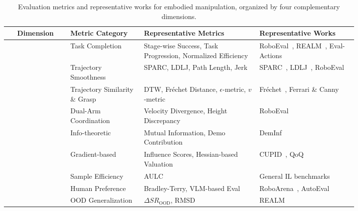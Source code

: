 \documentclass[acmsmall,screen,review,anonymous]{acmart}
\begin{document}
\begin{table}[t]
\centering
\caption{Evaluation metrics and representative works for embodied manipulation, organized by four complementary dimensions.}\label{tab:eval_metrics}
\renewcommand{\arraystretch}{1.15}
\setlength{\tabcolsep}{3pt}
\scriptsize
\begin{tabular}{
  c
  p{0.21\linewidth}
  p{0.33\linewidth}
  p{0.29\linewidth}
}
\toprule
\textbf{Dimension} & \textbf{Metric Category} & \textbf{Representative Metrics} & \textbf{Representative Works} \\
\midrule
{} 
 & Task Completion & Stage-wise Success, Task Progression, Normalized Efficiency & RoboEval~\cite{wang2025roboeval}, REALM~\cite{sedlacek2025realm}, Eval-Actions~\cite{liu2026evalactions} \\
 & Trajectory Smoothness & SPARC, LDLJ, Path Length, Jerk & SPARC~\cite{balasubramanian2015sparc}, LDLJ~\cite{antonelli2023movement}, RoboEval~\cite{wang2025roboeval} \\
 & Trajectory Similarity \& Grasp & DTW, Fr\'{e}chet Distance, $\epsilon$-metric, $v$-metric & Fr\'{e}chet~\cite{agarwal2012computingdiscretefrechetdistance}, Ferrari \& Canny~\cite{ferrari1992grasp} \\
 & Dual-Arm Coordination & Velocity Divergence, Height Discrepancy & RoboEval~\cite{wang2025roboeval} \\
\midrule
{} 
 & Info-theoretic & Mutual Information, Demo Contribution & DemInf~\cite{hejna2025robot} \\
 & Gradient-based & Influence Scores, Hessian-based Valuation & CUPID~\cite{agia2025cupidcuratingdatarobot}, QoQ~\cite{lee2026qoq} \\
 & Sample Efficiency & AULC & General IL benchmarks \\
\midrule
{} 
 & Human Preference & Bradley-Terry, VLM-based Eval & RoboArena~\cite{atreya2025roboarena}, AutoEval~\cite{zhou2025autoeval} \\
 & OOD Generalization & $\Delta SR_{\text{OOD}}$, RMSD & REALM~\cite{sedlacek2025realm} \\

\end{tabular}
\end{table}
\end{document}
